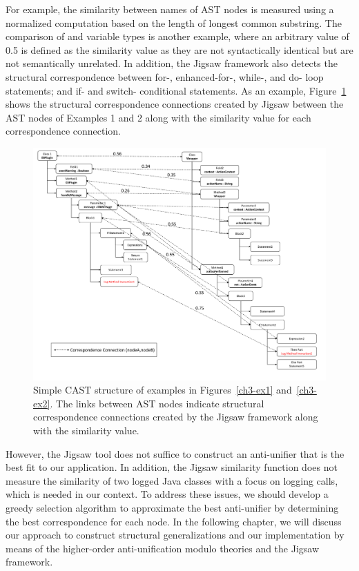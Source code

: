 For example, the similarity between names of AST nodes is measured using a normalized computation based on the length of longest common substring. The comparison of  and  variable types is another example, where an arbitrary value of 0.5 is defined as the similarity value as they are not syntactically identical but are not semantically unrelated. In addition, the Jigsaw framework also detects the structural correspondence between  for-, enhanced-for-, while-, and do- loop statements; and if- and switch- conditional statements. As an example, Figure~\ref{fig:meth-ast-1} shows the structural correspondence connections created by Jigsaw between the AST nodes of Examples 1 and 2 along with the similarity value for each correspondence connection.

\begin{figure} [H]
  \centering\includegraphics [width = \textwidth]{Drawing4/FirstCorr.pdf}
  \caption{Simple CAST structure of examples in Figures~\ref{ch3-ex1} and~\ref{ch3-ex2}. The links between AST nodes indicate structural correspondence connections created by the Jigsaw framework along with the similarity value.}
  \label{fig:meth-ast-1}
\end{figure}

However, the Jigsaw tool does not suffice to construct an anti-unifier that is the best fit to our application. In addition, the Jigsaw similarity function does not measure the similarity of two logged Java classes with a focus on logging calls, which is needed in our context. To address these issues, we should develop a greedy selection algorithm to approximate the best anti-unifier by determining the best correspondence for each node. In the following chapter, we will discuss our approach to construct structural generalizations and our implementation by means of the higher-order anti-unification modulo theories and the Jigsaw framework.

